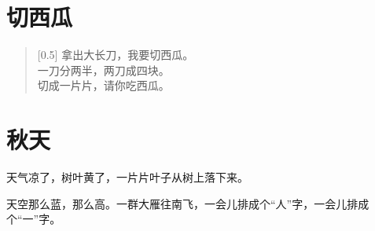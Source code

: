 \documentclass[12pt,UTF-8,openany]{ctexbook}
\begin{document}
\chapter{切西瓜}

\begin{large}
    
    \begin{verse}[0.5\linewidth]
        拿出大长刀，我要切西瓜。 \\
        一刀分两半，两刀成四块。 \\
        切成一片片，请你吃西瓜。
    \end{verse}
    
\end{large}


\clearpage

\begin{center}
    
\end{center}


\hanzibox{}\hanzibox{}\hanzibox{}\hanzibox{}\hspace{1em}\hanzibox{}\hanzibox{}\hanzibox{}\hanzibox{}

\hanzibox{}\hanzibox{}\hanzibox{}\hanzibox{}\hspace{1em}\hanzibox{}\hanzibox{}\hanzibox{}\hanzibox{}

\hanzibox{}\hanzibox{}\hanzibox{}\hanzibox{}\hspace{1em}\hanzibox{}\hanzibox{}\hanzibox{}\hanzibox{}

\hanzibox{}\hanzibox{}\hanzibox{}\hanzibox{}\hspace{1em}




\chapter{秋天}

\begin{large}
    
    天气凉了，树叶黄了，一片片叶子从树上落下来。
    
    天空那么蓝，那么高。一群大雁往南飞，一会儿排成个“人”字，一会儿排成个“一”字。
    
\end{large}


\clearpage
\end{document}
